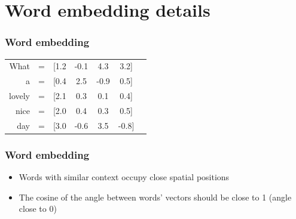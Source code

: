 
\section{Word embedding details}


\begin{frame}
\frametitle{Word embedding}

\begin{table}[h]
	\hspace{15mm}
	\huge
	\begin{tabular}{rcccccc}
		What & = & [1.2 & -0.1 & 4.3 & 3.2] \\
		a & = & [0.4 & 2.5 & -0.9 & 0.5] \\
		lovely & = & [2.1 & 0.3 & 0.1& 0.4] \\
		nice & = & [2.0& 0.4& 0.3& 0.5] \\
		day & = & [3.0& -0.6& 3.5& -0.8] \\
	\end{tabular}
\end{table}



\end{frame}



\begin{frame}
\frametitle{Word embedding}

	\begin{itemize}
		\item Words with similar context occupy close spatial positions
		\item The cosine of the angle between words' vectors should be close to 1 (angle close to 0)
	\end{itemize}

\end{frame}

